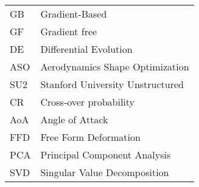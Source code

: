 \begin{longtable}[l]{l l}
GB & Gradient-Based\\
GF & Gradient free\\
DE & Differential Evolution\\
ASO & Aerodynamics Shape Optimization\\
SU2 & Stanford University Unstructured\\
CR & Cross-over probability\\
AoA & Angle of Attack\\
FFD & Free Form Deformation\\
PCA & Principal Component Analysis\\
SVD & Singular Value Decomposition\\
\end{longtable}
